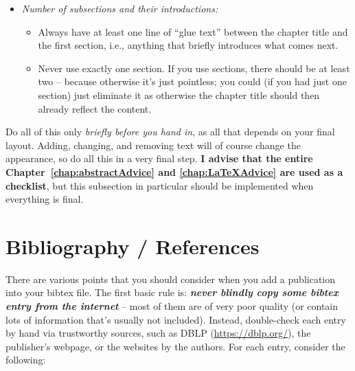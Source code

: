 \begin{itemize}
  \begin{itemize}
    \item When including graphics and in particular tables, make sure that they do not reach into the border. 
    \item This also (very) often happens in text, and mostly for formulae. That is ugly and careless, so rephrase to prevent that.
  \end{itemize}
  To find those errors easily, you can add ``draft'' as optional package argument to the documentclass (first line in the mainfile). Then, every~\hbox{verylongwordthatdoesnotbreak} (which all produce an ``overfull box'') will be shown with a black box next to it. \textbf{\emph{Try it now!}} (You will find such a box here!)
  \item \emph{Number of subsections and their introductions:}
  \begin{itemize}
    \item Always have at least one line of ``glue text'' between the chapter title and the first section, i.e., anything that briefly introduces what comes next.
    \item Never use exactly one section. If you use sections, there should be at least two -- because otherwise it's just pointless; you could (if you had just one section) just eliminate it as otherwise the chapter title should then already reflect the content.
  \end{itemize}
\end{itemize}

Do all of this only \emph{briefly before you hand in}, as all that depends on your final layout. Adding, changing, and removing text will of course change the appearance, so do all this in a very final step. \textbf{I advise that the entire Chapter~\ref{chap:abstractAdvice} and \ref{chap:LaTeXAdvice} are used as a checklist}, but this subsection in particular should be implemented when everything is final.
    

    
\section{Bibliography / References}

There are various points that you should consider when you add a publication into your bibtex file. The first basic rule is: \textbf{\emph{never blindly copy some bibtex entry from the internet}} -- most of them are of very poor quality (or contain lots of information that's usually not included). Instead, double-check each entry by hand via trustworthy sources, such as DBLP (\url{https://dblp.org/}), the publisher's webpage, or the websites by the authors. For each entry, consider the following:
 
